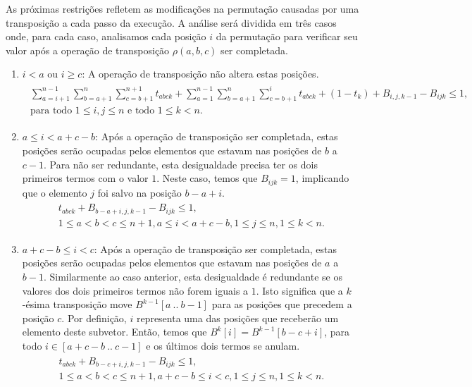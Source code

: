As próximas restrições refletem as modificações na permutação causadas
por uma transposição a cada passo da execução. A análise será dividida
em três casos onde, para cada caso, analisamos cada posição $i$ da
permutação para verificar seu valor após a operação de transposição
$\rho(a,b,c)$ ser completada.
\begin{enumerate}
\item{$i < a$ ou $i \ge c$:
A operação de transposição não altera estas posições.
\begin{align}
  \begin{split} 
    \sum_{a=i+1}^{n-1}\sum_{b=a+1}^{n}\sum_{c=b+1}^{n+1} t_{abck}
    + \sum_{a=1}^{n-1}\sum_{b=a+1}^{n}\sum_{c=b+1}^{i} t_{abck} + (1 -
    t_{k}) + B_{i,j,k-1} - B_{ijk} \le 1, \\
    \text{para todo $1 \le i, j \le n$ e todo $1 \le k <
    n$}.
  \end{split} \label{eq:transp3}
\end{align}}
\item{$a \le i < a + c -b$:
Após a operação de transposição ser completada, estas posições serão
ocupadas pelos elementos que estavam nas posições de $b$ a $c - 1$. Para
não ser redundante, esta desigualdade precisa ter os dois primeiros
termos com o valor $1$. Neste caso, temos que $B_{ijk} = 1$, implicando
que o elemento $j$ foi salvo na posição $b - a + i$.
\begin{align}
  \begin{split}
  t_{abck} + B_{b-a+i,j,k-1} - B_{ijk} \le 1, \\
  \text{$1 \le a < b < c \le n + 1, a \le i < a + c -b, 1 \le j
  \le n, 1 \le k < n$}.
  \end{split}
  \label{eq:transp4}
\end{align}}
\item{$a + c - b \le i < c$:
Após a operação de transposição ser completada, estas posições serão
ocupadas pelos elementos que estavam nas posições de $a$ a $b - 1$.
Similarmente ao caso anterior, esta desigualdade é redundante se os
valores dos dois primeiros termos não forem iguais a $1$. Isto significa
que a $k$-ésima transposição move $B^{k-1}[a~..~b-1]$ para as posições
que precedem a posição $c$. Por definição, $i$ representa uma das
posições que receberão um elemento deste subvetor. Então, temos que
$B^{k}[i] = B^{k-1}[b - c + i]$, para todo $i \in [a + c - b~..~c - 1]$
e os últimos dois termos se anulam.
\begin{align}
  \begin{split}
  t_{abck} + B_{b-c+i,j,k-1} - B_{ijk} \le 1, \\
  \text{$1 \le a < b < c \le n + 1, a + c - b \le i < c, 1 \le j
  \le n, 1 \le k < n$}.  
  \end{split}
  \label{eq:transp5}
\end{align}}
\end{enumerate}

